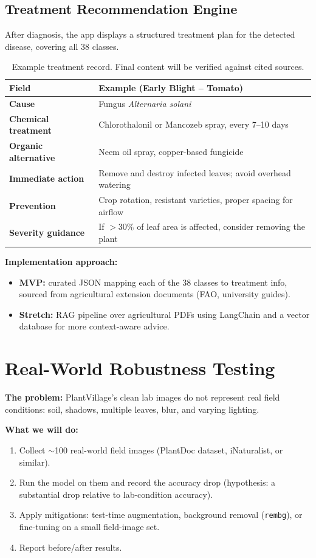 \documentclass[11pt,a4paper]{article}
\begin{document}
\subsection{Treatment Recommendation Engine}
After diagnosis, the app displays a structured treatment plan for the detected disease, covering all 38 classes.

\begin{table}[h]
\centering
\begin{tabular}{@{}>{\bfseries}p{3.4cm}p{11cm}@{}}
\toprule
Field & Example (Early Blight -- Tomato) \\
\midrule
Cause & Fungus \textit{Alternaria solani} \\
Chemical treatment & Chlorothalonil or Mancozeb spray, every 7--10 days \\
Organic alternative & Neem oil spray, copper-based fungicide \\
Immediate action & Remove and destroy infected leaves; avoid overhead watering \\
Prevention & Crop rotation, resistant varieties, proper spacing for airflow \\
Severity guidance & If $>30\%$ of leaf area is affected, consider removing the plant \\
\bottomrule
\end{tabular}
\caption{Example treatment record. Final content will be verified against cited sources.}
\end{table}

\textbf{Implementation approach:}
\begin{itemize}
  \item \textbf{MVP:} curated JSON mapping each of the 38 classes to treatment info, sourced from agricultural extension documents (FAO, university guides).
  \item \textbf{Stretch:} RAG pipeline over agricultural PDFs using LangChain and a vector database for more context-aware advice.
\end{itemize}

\section{Real-World Robustness Testing}\label{sec:robust}
\textbf{The problem:} PlantVillage's clean lab images do not represent real field conditions: soil, shadows, multiple leaves, blur, and varying lighting.

\textbf{What we will do:}
\begin{enumerate}
  \item Collect $\sim$100 real-world field images (PlantDoc dataset, iNaturalist, or similar).
  \item Run the model on them and record the accuracy drop (hypothesis: a substantial drop relative to lab-condition accuracy).
  \item Apply mitigations: test-time augmentation, background removal (\texttt{rembg}), or fine-tuning on a small field-image set.
  \item Report before/after results.
\end{enumerate}
\end{document}
